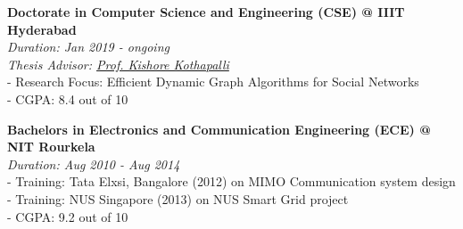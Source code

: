 \textbf{Doctorate in Computer Science and Engineering (CSE) @ IIIT Hyderabad} \\
\emph{Duration: Jan 2019 - ongoing} \\
\emph{Thesis Advisor: \href{https://faculty.iiit.ac.in/~kkishore/}{Prof. Kishore Kothapalli}} \\
- Research Focus: Efficient Dynamic Graph Algorithms for Social Networks \\
- CGPA: 8.4 out of 10

\noindent
\textbf{Bachelors in Electronics and Communication Engineering (ECE) @ NIT Rourkela} \\
\emph{Duration: Aug 2010 - Aug 2014} \\
- Training: Tata Elxsi, Bangalore (2012) on MIMO Communication system design \\
- Training: NUS Singapore (2013) on NUS Smart Grid project \\
- CGPA: 9.2 out of 10
